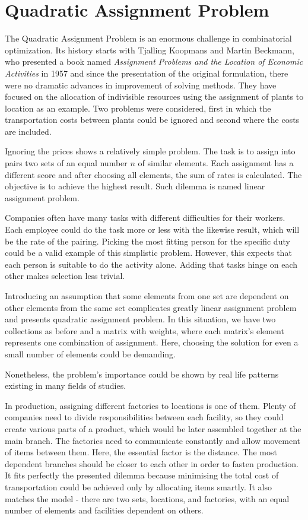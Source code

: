 \section{Quadratic Assignment Problem}
\label{section:background_qap}

The Quadratic Assignment Problem is an enormous challenge in combinatorial optimization.
Its history starts with Tjalling Koopmans and Martin Beckmann, who presented a book named \textit{Assignment Problems and the Location of Economic Activities} in 1957 \cite{koopmans-beckmann1957} and since the presentation of the original formulation, there were no dramatic advances in improvement of solving methods.
They have focused on the allocation of indivisible resources using the assignment of plants to location as an example.
Two problems were considered, first in which the transportation costs between plants could be ignored and second where the costs are included.

Ignoring the prices shows a relatively simple problem.
The task is to assign into pairs two sets of an equal number $n$ of similar elements.
Each assignment has a different score and after choosing all elements, the sum of rates is calculated.
The objective is to achieve the highest result.
Such dilemma is named linear assignment problem.

Companies often have many tasks with different difficulties for their workers.
Each employee could do the task more or less with the likewise result, which will be the rate of the pairing.
Picking the most fitting person for the specific duty could be a valid example of this simplistic problem.
However, this expects that each person is suitable to do the activity alone.
Adding that tasks hinge on each other makes selection less trivial.

Introducing an assumption that some elements from one set are dependent on other elements from the same set complicates greatly linear assignment problem and presents quadratic assignment problem.
In this situation, we have two collections as before and a matrix with weights, where each matrix's element represents one combination of assignment.
Here, choosing the solution for even a small number of elements could be demanding.

Nonetheless, the problem's importance could be shown by real life patterns existing in many fields of studies.

In production, assigning different factories to locations is one of them.
Plenty of companies need to divide responsibilities between each facility, so they could create various parts of a product, which would be later assembled together at the main branch.
The factories need to communicate constantly and allow movement of items between them.
Here, the essential factor is the distance.
The most dependent branches should be closer to each other in order to fasten production.
It fits perfectly the presented dilemma because minimising the total cost of transportation could be achieved only by allocating items smartly.
It also matches the model - there are two sets, locations, and factories, with an equal number of elements and facilities dependent on others.

